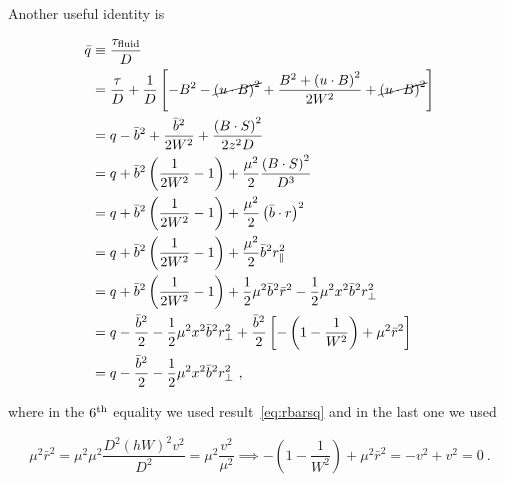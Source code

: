 \documentclass{article}
\newcommand{\BdotS}{B\cdot S}
\newcommand{\udotB}{u\cdot B}
\newcommand{\eq}[1]{
\begin{equation}
    #1
\end{equation}
}
\newcommand{\spl}[1]{
\eq{
\begin{split}
    #1
\end{split}
}
}
\begin{document}
\noindent Another useful identity is

\spl{
  \bar{q} &\equiv \frac{\tau_{\rm fluid}}{D}\\
  &= \frac{\tau}{D} + \frac{1}{D}\left[- B^{2} - \cancel{\left(\udotB\right)^{2}} + \frac{B^{2} + \left(\udotB\right)^{2}}{2W^{2}} + \cancel{\left(\udotB\right)^{2}}\right]\\
  &= q - \bar{b}^{2} + \frac{\bar{b}^{2}}{2W^{2}} + \frac{\left(\BdotS\right)^{2}}{2z^{2}D}\\
  &= q + \bar{b}^{2}\left(\frac{1}{2W^{2}} - 1\right) + \frac{\mu^{2}}{2}\frac{\left(\BdotS\right)^{2}}{D^{3}}\\
  &= q + \bar{b}^{2}\left(\frac{1}{2W^{2}} - 1\right) + \frac{\mu^{2}}{2}\left(\bar{b}\cdot r\right)^{2}\\
  &= q + \bar{b}^{2}\left(\frac{1}{2W^{2}} - 1\right) + \frac{\mu^{2}}{2}\bar{b}^{2}r^{2}_{\parallel}\\
  &= q + \bar{b}^{2}\left(\frac{1}{2W^{2}} - 1\right) + \frac{1}{2}\mu^{2}\bar{b}^{2}\bar{r}^{2} - \frac{1}{2}\mu^{2}x^{2}\bar{b}^{2}r^{2}_{\perp}\\
  &= q - \frac{\bar{b}^{2}}{2} - \frac{1}{2}\mu^{2}x^{2}\bar{b}^{2}r^{2}_{\perp} + \frac{\bar{b}^{2}}{2}\left[-\left(1 - \frac{1}{W^{2}}\right) + \mu^{2}\bar{r}^{2}\right]\\
  &= q - \frac{\bar{b}^{2}}{2} - \frac{1}{2}\mu^{2}x^{2}\bar{b}^{2}r^{2}_{\perp}\ ,
}

\noindent where in the $6^{\rm th}$  equality we used result~\eqref{eq:rbarsq} and in the last one we used

\eq{
  \mu^{2}\bar{r}^{2} = \mu^{2}\mu^{2}\frac{D^{2}\left(hW\right)^{2}v^{2}}{D^{2}} = \mu^{2}\frac{v^{2}}{\mu^{2}} \implies -\left(1-\frac{1}{W^{2}}\right) + \mu^{2}\bar{r}^{2} = -v^{2} + v^{2} = 0\ .
}

\clearpage
\printbibliography
\end{document}
